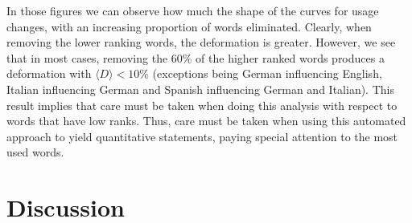 \documentclass[10pt,letterpaper]{article} %
\begin{document}
In those figures we can observe how much the shape of the curves for usage changes, 
with an increasing proportion of words eliminated. Clearly, when removing the 
lower ranking words, the deformation is greater. However, we see that in 
most cases,  removing the 60\% of the higher ranked words produces
a deformation with $\langle D \rangle < 10\%$ (exceptions being 
German influencing English, Italian influencing German and
Spanish influencing German and Italian). 
% 
% 
% 
% 
This result implies that care must be taken when doing this analysis with respect to 
words that have low ranks. Thus, care must be taken when using this automated approach
to yield quantitative statements, paying special attention to the most used words. 



\section*{Discussion} %
\end{document}
